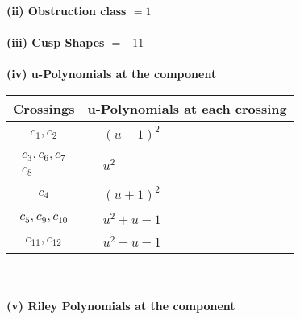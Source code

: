 \documentclass[1p]{elsarticle_modified}
\theoremstyle{definition}
\begin{document}
\flushleft \textbf{(ii) Obstruction class $= 1$}\\~\\
\flushleft \textbf{(iii) Cusp Shapes $= -11$}\\~\\
\newpage\renewcommand{\arraystretch}{1}
\flushleft \textbf{(iv) u-Polynomials at the component}\newline \\
\begin{tabular}{m{50pt}|m{274pt}}
Crossings & \hspace{64pt}u-Polynomials at each crossing \\
\hline $$\begin{aligned}c_{1},c_{2}\end{aligned}$$&$\begin{aligned}
&(u-1)^2
\end{aligned}$\\
\hline $$\begin{aligned}c_{3},c_{6},c_{7}\\c_{8}\end{aligned}$$&$\begin{aligned}
&u^2
\end{aligned}$\\
\hline $$\begin{aligned}c_{4}\end{aligned}$$&$\begin{aligned}
&(u+1)^2
\end{aligned}$\\
\hline $$\begin{aligned}c_{5},c_{9},c_{10}\end{aligned}$$&$\begin{aligned}
&u^2+u-1
\end{aligned}$\\
\hline $$\begin{aligned}c_{11},c_{12}\end{aligned}$$&$\begin{aligned}
&u^2- u-1
\end{aligned}$\\
\hline
\end{tabular}\\~\\
\newpage\renewcommand{\arraystretch}{1}
\flushleft \textbf{(v) Riley Polynomials at the component}\newline \\
\end{document}
